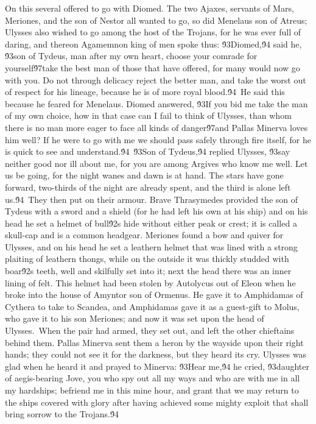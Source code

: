 {On this several offered to go with Diomed. The two Ajaxes, servants of Mars, Meriones, and the son of Nestor all wanted to go, so did Menelaus son of Atreus; Ulysses also wished to go among the host of the Trojans, for he was ever full of daring, and thereon Agamemnon king of men spoke thus: \'93Diomed,\'94 said he, \'93son of Tydeus, man after my own heart, choose your comrade for yourself\'97take the best man of those that have offered, for many would now go with you. Do not through delicacy reject the better man, and take the worst out of respect for his lineage, because he is of more royal blood.\'94\
He said this because he feared for Menelaus. Diomed answered, \'93If you bid me take the man of my own choice, how in that case can I fail to think of Ulysses, than whom there is no man more eager to face all kinds of danger\'97and Pallas Minerva loves him well? If he were to go with me we should pass safely through fire itself, for he is quick to see and understand.\'94\
\'93Son of Tydeus,\'94 replied Ulysses, \'93say neither good nor ill about me, for you are among Argives who know me well. Let us be going, for the night wanes and dawn is at hand. The stars have gone forward, two-thirds of the night are already spent, and the third is alone left us.\'94\
They then put on their armour. Brave Thrasymedes provided the son of Tydeus with a sword and a shield (for he had left his own at his ship) and on his head he set a helmet of bull\'92s hide without either peak or crest; it is called a skull-cap and is a common headgear. Meriones found a bow and quiver for Ulysses, and on his head he set a leathern helmet that was lined with a strong plaiting of leathern thongs, while on the outside it was thickly studded with boar\'92s teeth, well and skilfully set into it; next the head there was an inner lining of felt. This helmet had been stolen by Autolycus out of Eleon when he broke into the house of Amyntor son of Ormenus. He gave it to Amphidamas of Cythera to take to Scandea, and Amphidamas gave it as a guest-gift to Molus, who gave it to his son Meriones; and now it was set upon the head of Ulysses.\
When the pair had armed, they set out, and left the other chieftains behind them. Pallas Minerva sent them a heron by the wayside upon their right hands; they could not see it for the darkness, but they heard its cry. Ulysses was glad when he heard it and prayed to Minerva: \'93Hear me,\'94 he cried, \'93daughter of aegis-bearing Jove, you who spy out all my ways and who are with me in all my hardships; befriend me in this mine hour, and grant that we may return to the ships covered with glory after having achieved some mighty exploit that shall bring sorrow to the Trojans.\'94\
}
